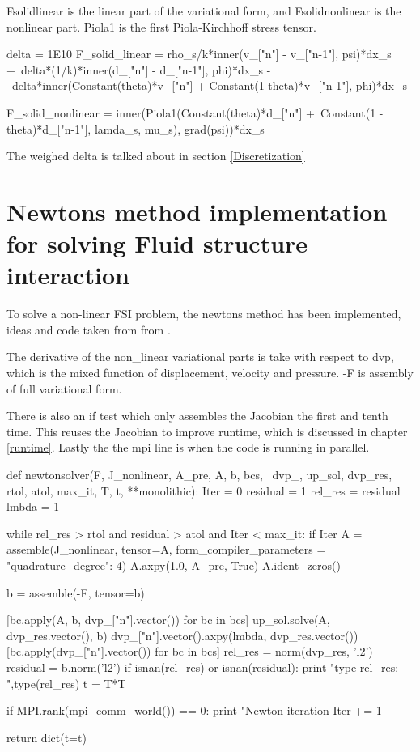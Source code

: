 Fsolidlinear is the linear part of the variational form, and Fsolidnonlinear is the nonlinear part.
Piola1 is the first Piola-Kirchhoff stress tensor.
\begin{python}
delta = 1E10
F_solid_linear = rho_s/k*inner(v_["n"] - v_["n-1"], psi)*dx_s +\
delta*(1/k)*inner(d_["n"] - d_["n-1"], phi)*dx_s -\
delta*inner(Constant(theta)*v_["n"] + Constant(1-theta)*v_["n-1"], phi)*dx_s

F_solid_nonlinear = inner(Piola1(Constant(theta)*d_["n"] +\
Constant(1 - theta)*d_["n-1"], lamda_s, mu_s), grad(psi))*dx_s
\end{python}

The weighed delta is talked about in section \ref{Discretization}

\section{Newtons method implementation for solving Fluid structure interaction}
To solve a non-linear FSI problem, the newtons method has been implemented, ideas and code taken from from \cite{White2006}.

The derivative of the non_linear variational parts is take with respect to dvp, which is the mixed function of displacement, velocity and pressure. -F is assembly of full variational form.


There is also an if test which only assembles the Jacobian the first and tenth time. This reuses the Jacobian to improve runtime, which is discussed in chapter \ref{runtime}. Lastly the the mpi line is when the code is running in parallel.
\begin{python}
def newtonsolver(F, J_nonlinear, A_pre, A, b, bcs, \
                dvp_, up_sol, dvp_res, rtol, atol, max_it, T, t, **monolithic):
    Iter      = 0
    residual   = 1
    rel_res    = residual
    lmbda = 1

    while rel_res > rtol and residual > atol and Iter < max_it:
        if Iter %
            A = assemble(J_nonlinear, tensor=A, form_compiler_parameters = {"quadrature_degree": 4})
            A.axpy(1.0, A_pre, True)
            A.ident_zeros()

        b = assemble(-F, tensor=b)

        [bc.apply(A, b, dvp_["n"].vector()) for bc in bcs]
        up_sol.solve(A, dvp_res.vector(), b)
        dvp_["n"].vector().axpy(lmbda, dvp_res.vector())
        [bc.apply(dvp_["n"].vector()) for bc in bcs]
        rel_res = norm(dvp_res, 'l2')
        residual = b.norm('l2')
        if isnan(rel_res) or isnan(residual):
            print "type rel_res: ",type(rel_res)
            t = T*T

        if MPI.rank(mpi_comm_world()) == 0:
            print "Newton iteration %
        Iter += 1

    return dict(t=t)
\end{python}




	